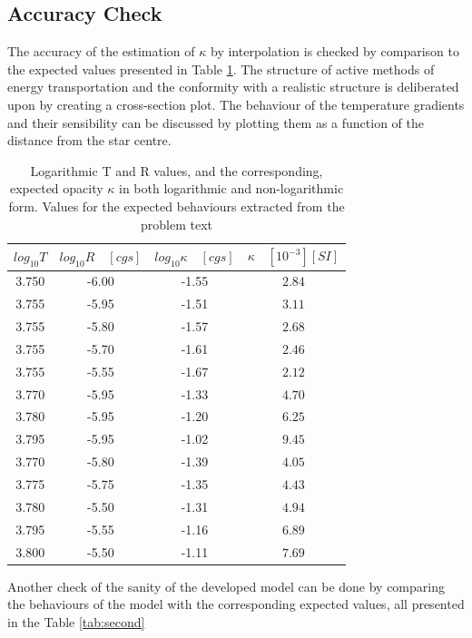 \documentclass[10pt, nofootinbib, twocolumn]{revtex4-1}
\begin{document}
\subsection{Accuracy Check}
The accuracy of the estimation of $\kappa$ by interpolation is checked by comparison to the expected values presented in Table \ref{tab:acc_kappa}. The structure of active methods of energy transportation  and the conformity with a realistic structure is deliberated upon by creating a cross-section plot. The behaviour of the temperature gradients and their sensibility can be discussed by plotting them as a function of the distance from the star centre. 
\begin{center}
\begin{table}[H]
\caption{Logarithmic T and R values, and the corresponding, expected opacity $\kappa$ in both logarithmic and non-logarithmic form. Values for the expected behaviours extracted from the problem text}
    \begin{tabular*}{0.5\textwidth}{@{\extracolsep{\fill}}cccc}
    \toprule
    $log_{10}T$ & $log_{10}R \quad[cgs]$ & $log_{10}\kappa \quad[cgs]$ & $\kappa \quad[10^{-3}][SI]$ \\
    \hline 
    3.750 & -6.00 & -1.55 & $2.84$ \\
    3.755 & -5.95 & -1.51 & $3.11$ \\
    3.755 & -5.80 & -1.57 & $2.68$ \\
    3.755 & -5.70 & -1.61 & $2.46$ \\
    3.755 & -5.55 & -1.67 & $2.12$ \\
    3.770 & -5.95 & -1.33 & $4.70$ \\
    3.780 & -5.95 & -1.20 & $6.25$ \\
    3.795 & -5.95 & -1.02 & $9.45$ \\
    3.770 & -5.80 & -1.39 & $4.05$ \\
    3.775 & -5.75 & -1.35 & $4.43$ \\
    3.780 & -5.50 & -1.31 & $4.94$ \\
    3.795 & -5.55 & -1.16 & $6.89$ \\
    3.800 & -5.50 & -1.11 & $7.69$ 
    \end{tabular*}
    \label{tab:acc_kappa}
\end{table}
\end{center}


Another check of the sanity of the developed model can be done by comparing the behaviours of the model with the corresponding expected values, all presented in the Table \ref{tab:second}
\end{document}
